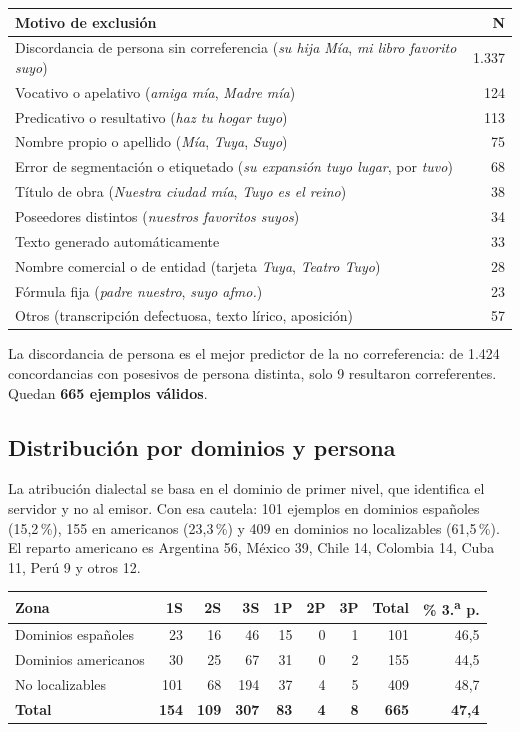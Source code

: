 \documentclass[12pt,a4paper]{article}
\begin{document}
\begin{longtable}{@{}p{10cm}r@{}}
\toprule
Motivo de exclusión & N \\
\midrule
\endhead
Discordancia de persona sin correferencia (\textit{su hija Mía}, \textit{mi libro favorito suyo}) & 1.337 \\
Vocativo o apelativo (\textit{amiga mía}, \textit{Madre mía}) & 124 \\
Predicativo o resultativo (\textit{haz tu hogar tuyo}) & 113 \\
Nombre propio o apellido (\textit{Mía}, \textit{Tuya}, \textit{Suyo}) & 75 \\
Error de segmentación o etiquetado (\textit{su expansión tuyo lugar}, por \textit{tuvo}) & 68 \\
Título de obra (\textit{Nuestra ciudad mía}, \textit{Tuyo es el reino}) & 38 \\
Poseedores distintos (\textit{nuestros favoritos suyos}) & 34 \\
Texto generado automáticamente & 33 \\
Nombre comercial o de entidad (tarjeta \textit{Tuya}, \textit{Teatro Tuyo}) & 28 \\
Fórmula fija (\textit{padre nuestro}, \textit{suyo afmo.}) & 23 \\
Otros (transcripción defectuosa, texto lírico, aposición) & 57 \\
\bottomrule
\end{longtable}

La discordancia de persona es el mejor predictor de la no correferencia: de 1.424 concordancias con posesivos de persona distinta, solo 9 resultaron correferentes. Quedan \textbf{665 ejemplos válidos}.

\subsection{Distribución por dominios y persona}

La atribución dialectal se basa en el dominio de primer nivel, que identifica el servidor y no al emisor. Con esa cautela: 101 ejemplos en dominios españoles (15,2\,\%), 155 en americanos (23,3\,\%) y 409 en dominios no localizables (61,5\,\%). El reparto americano es Argentina 56, México 39, Chile 14, Colombia 14, Cuba 11, Perú 9 y otros 12.

\begin{table}[h]
\centering
\small
\begin{tabular}{@{}lrrrrrrrr@{}}
\toprule
Zona & 1S & 2S & 3S & 1P & 2P & 3P & Total & \% 3.\textsuperscript{a} p. \\
\midrule
Dominios españoles  & 23  & 16  & 46  & 15 & 0 & 1 & 101 & 46,5 \\
Dominios americanos & 30  & 25  & 67  & 31 & 0 & 2 & 155 & 44,5 \\
No localizables     & 101 & 68  & 194 & 37 & 4 & 5 & 409 & 48,7 \\
\midrule
\textbf{Total} & \textbf{154} & \textbf{109} & \textbf{307} & \textbf{83} & \textbf{4} & \textbf{8} & \textbf{665} & \textbf{47,4} \\
\bottomrule
\end{tabular}
\end{table}
\end{document}
